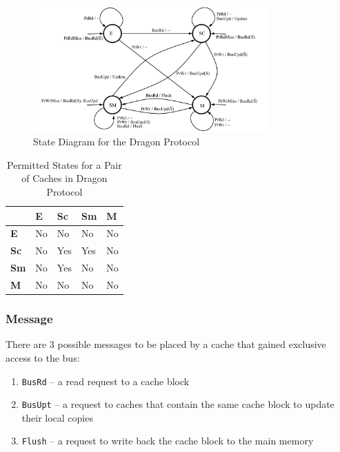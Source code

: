 \documentclass[nonacm,acmsmall,screen,11pt]{acmart}
\begin{document}
\begin{figure}[!htb]
  \centering
  \includegraphics[width=0.8\textwidth]{dragon}
  \caption{State Diagram for the Dragon Protocol}
\end{figure}

\begin{table}[!htb]
  \centering
  \caption{Permitted States for a Pair of Caches in Dragon Protocol}
  \label{tab:dragon}
  \begin{tabular}{|l|l|l|l|l|}
    \hline
                & \textbf{E} & \textbf{Sc} & \textbf{Sm} & \textbf{M} \\ \hline
    \textbf{E}  & No         & No          & No          & No         \\ \hline
    \textbf{Sc} & No         & Yes         & Yes         & No         \\ \hline
    \textbf{Sm} & No         & Yes         & No          & No         \\ \hline
    \textbf{M}  & No         & No          & No          & No         \\ \hline
  \end{tabular}
\end{table}

\subsubsection{Message}
There are 3 possible messages to be placed by a cache that gained exclusive access to the bus:
\begin{enumerate}
  \item \texttt{BusRd} -- a read request to a cache block
  \item \texttt{BusUpt} -- a request to caches that contain the same cache block to update their local copies
  \item \texttt{Flush} -- a request to write back the cache block to the main memory
\end{enumerate}
\end{document}
